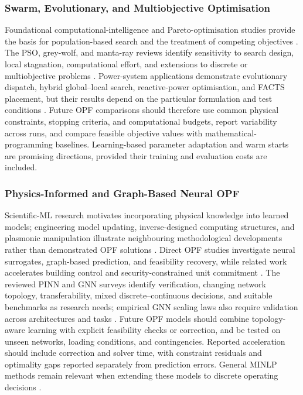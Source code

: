 \documentclass[a4paper,fleqn]{cas-sc}
\begin{document}
\subsubsection{Swarm, Evolutionary, and Multiobjective Optimisation}\label{subsubsec:gaps_metaheuristics}

Foundational computational-intelligence and Pareto-optimisation studies provide the basis for population-based search and the treatment of competing objectives \cite{opfRef010,opfRef008}. The PSO, grey-wolf, and manta-ray reviews identify sensitivity to search design, local stagnation, computational effort, and extensions to discrete or multiobjective problems \cite{del2008particle,opfRef035,opfRef070,shami2022particle}. Power-system applications demonstrate evolutionary dispatch, hybrid global--local search, reactive-power optimisation, and FACTS placement, but their results depend on the particular formulation and test conditions \cite{opfRef004,opfRef005,opfRef006,opfRef007,opfRef014,opfRef017}. Future OPF comparisons should therefore use common physical constraints, stopping criteria, and computational budgets, report variability across runs, and compare feasible objective values with mathematical-programming baselines. Learning-based parameter adaptation and warm starts are promising directions, provided their training and evaluation costs are included.

\subsubsection{Physics-Informed and Graph-Based Neural OPF}\label{subsubsec:gaps_neural_opf}

Scientific-ML research motivates incorporating physical knowledge into learned models; engineering model updating, inverse-designed computing structures, and plasmonic manipulation illustrate neighbouring methodological developments rather than demonstrated OPF solutions \cite{willard2022integrating,opfRef016,opfRef056,opfRef088}. Direct OPF studies investigate neural surrogates, graph-based prediction, and feasibility recovery, while related work accelerates building control and security-constrained unit commitment \cite{zamzam2020learning,opfRef071,opfRef082,opfRef041,xavier2021learning}. The reviewed PINN and GNN surveys identify verification, changing network topology, transferability, mixed discrete--continuous decisions, and suitable benchmarks as research needs; empirical GNN scaling laws also require validation across architectures and tasks \cite{huang2022applications,liao2021review,zhu2024scaling,farea2024understanding}. Future OPF models should combine topology-aware learning with explicit feasibility checks or correction, and be tested on unseen networks, loading conditions, and contingencies. Reported acceleration should include correction and solver time, with constraint residuals and optimality gaps reported separately from prediction errors. General MINLP methods remain relevant when extending these models to discrete operating decisions \cite{opfRef020}.
\end{document}
